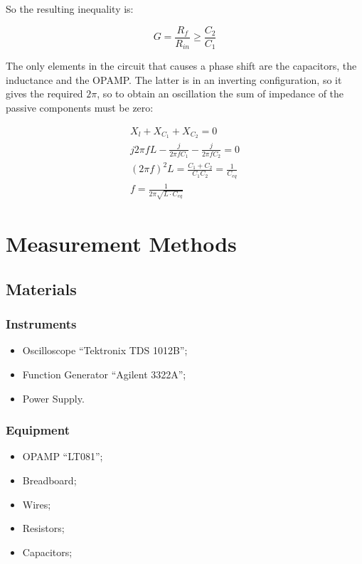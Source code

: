 \documentclass[a4paper, twocolumn]{article}
\begin{document}
So the resulting inequality is:

\begin{equation}
    G = \frac{R_f}{R_{in}} \ge \frac{C_2}{C_1}
\end{equation}

The only elements in the circuit that causes a phase shift are the capacitors, the inductance and the OPAMP. The latter is in an inverting configuration, so it gives the required $2\pi$, so to obtain an oscillation the sum of impedance of the passive components must be zero:

\begin{gather}
    X_l + X_{C_1}+X_{C_2}=0\\
    j2\pi fL -\frac{j}{2\pi fC_1} -\frac{j}{2\pi fC_2} = 0\\
    (2\pi f)^2 L = \frac{C_1+C_2}{C_1C_2}=\frac{1}{C_{eq}}\\
    f = \frac{1}{2\pi\sqrt{L\cdot C_{eq}}}  
\end{gather} 

\section{Measurement Methods}
\subsection{Materials}
\subsubsection{Instruments}
\begin{itemize}
    \item Oscilloscope ``Tektronix TDS 1012B'';
    \item Function Generator ``Agilent 3322A'';
    \item Power Supply.
\end{itemize}
\subsubsection{Equipment}
\begin{itemize}
    \item OPAMP ``LT081'';
    \item Breadboard;
    \item Wires;
    \item Resistors;
    \item Capacitors;
\end{itemize}
\end{document}
